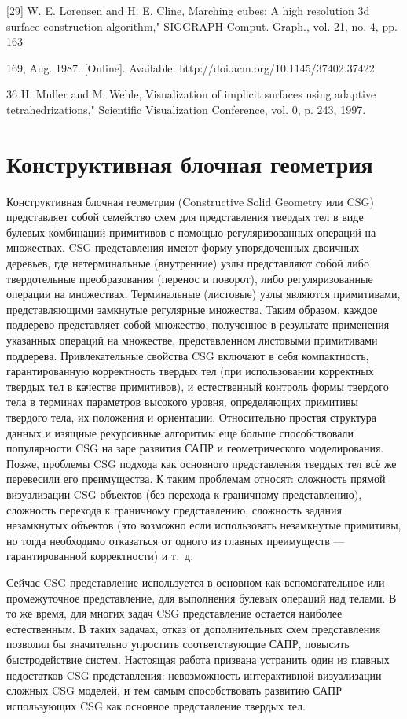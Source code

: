 {{{{{{[29] W. E. Lorensen and H. E. Cline, Marching cubes: A high resolution 3d surface
construction algorithm," SIGGRAPH Comput. Graph., vol. 21, no. 4, pp. 163{
169, Aug. 1987. [Online]. Available: http://doi.acm.org/10.1145/37402.37422

36 H. Muller and M. Wehle, Visualization of implicit surfaces using adaptive tetrahedrizations," Scientific Visualization Conference, vol. 0, p. 243, 1997.

\section{Конструктивная блочная геометрия} \label{sect_csg}

Конструктивная блочная геометрия (Constructive Solid Geometry или CSG) представляет собой семейство схем для представления твердых тел в виде булевых комбинаций примитивов с помощью регуляризованных \cite{Requicha80} \cite{Requicha77} операций на множествах. CSG представления имеют форму упорядоченных двоичных деревьев, где нетерминальные (внутренние) узлы представляют собой либо твердотельные преобразования (перенос и поворот), либо регуляризованные операции на множествах. Терминальные (листовые) узлы являются примитивами, представляющими замкнутые регулярные множества. Таким образом, каждое поддерево представляет собой множество, полученное в результате применения указанных операций на множестве, представленном листовыми примитивами поддерева. Привлекательные свойства CSG включают в себя компактность, гарантированную корректность твердых тел (при использовании корректных твердых тел в качестве примитивов), и естественный контроль формы твердого тела в терминах параметров высокого уровня, определяющих примитивы твердого тела, их положения и ориентации. Относительно простая структура данных и изящные рекурсивные алгоритмы еще больше способствовали популярности CSG на заре развития САПР и геометрического моделирования. Позже, проблемы CSG подхода как основного представления твердых тел всё же перевесили его преимущества. К таким проблемам относят: сложность прямой визуализации CSG объектов (без перехода к граничному представлению), сложность перехода к граничному представлению, сложность задания незамкнутых объектов (это возможно если использовать незамкнутые примитивы, но тогда необходимо отказаться от одного из главных преимуществ — гарантированной корректности) и т. д.

Сейчас CSG представление используется в основном как вспомогательное или промежуточное представление, для выполнения булевых операций над телами. В то же время, для многих задач CSG представление остается наиболее естественным. В таких задачах, отказ от дополнительных схем представления позволил бы значительно упростить соответствующие САПР, повысить быстродействие систем. Настоящая работа призвана устранить один из главных недостатков CSG представления: невозможность интерактивной визуализации сложных CSG моделей, и тем самым способствовать развитию САПР использующих CSG как основное представление твердых тел.

}}}}}}}
